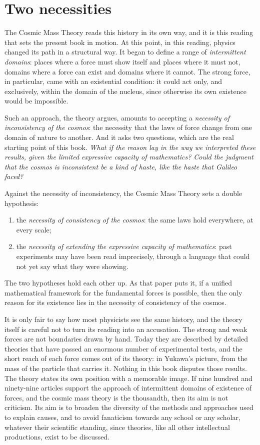 \section{Two necessities}\label{sec:two-necessities}

The Cosmic Mass Theory reads this history in its own way, and it is this reading that sets the present book in motion. At this point, in this reading, physics changed its path in a structural way. It began to define a range of \emph{intermittent domains}: places where a force must show itself and places where it must not, domains where a force can exist and domains where it cannot. The strong force, in particular, came with an existential condition: it could act only, and exclusively, within the domain of the nucleus, since otherwise its own existence would be impossible.

Such an approach, the theory argues, amounts to accepting a \emph{necessity of inconsistency of the cosmos}: the necessity that the laws of force change from one domain of nature to another. And it asks two questions, which are the real starting point of this book. \emph{What if the reason lay in the way we interpreted these results, given the limited expressive capacity of mathematics? Could the judgment that the cosmos is inconsistent be a kind of haste, like the haste that Galileo faced?}

Against the necessity of inconsistency, the Cosmic Mass Theory sets a double hypothesis:
\begin{enumerate}
  \item the \emph{necessity of consistency of the cosmos}: the same laws hold everywhere, at every scale;
  \item the \emph{necessity of extending the expressive capacity of mathematics}: past experiments may have been read imprecisely, through a language that could not yet say what they were showing.
\end{enumerate}
The two hypotheses hold each other up. As that paper puts it, if a unified mathematical framework for the fundamental forces is possible, then the only reason for its existence lies in the necessity of consistency of the cosmos.

It is only fair to say how most physicists see the same history, and the theory itself is careful not to turn its reading into an accusation. The strong and weak forces are not boundaries drawn by hand. Today they are described by detailed theories that have passed an enormous number of experimental tests, and the short reach of each force comes out of its theory: in Yukawa's picture, from the mass of the particle that carries it. Nothing in this book disputes those results. The theory states its own position with a memorable image. If nine hundred and ninety-nine articles support the approach of intermittent domains of existence of forces, and the cosmic mass theory is the thousandth, then its aim is not criticism. Its aim is to broaden the diversity of the methods and approaches used to explain causes, and to avoid fanaticism towards any school or any scholar, whatever their scientific standing, since theories, like all other intellectual productions, exist to be discussed.

